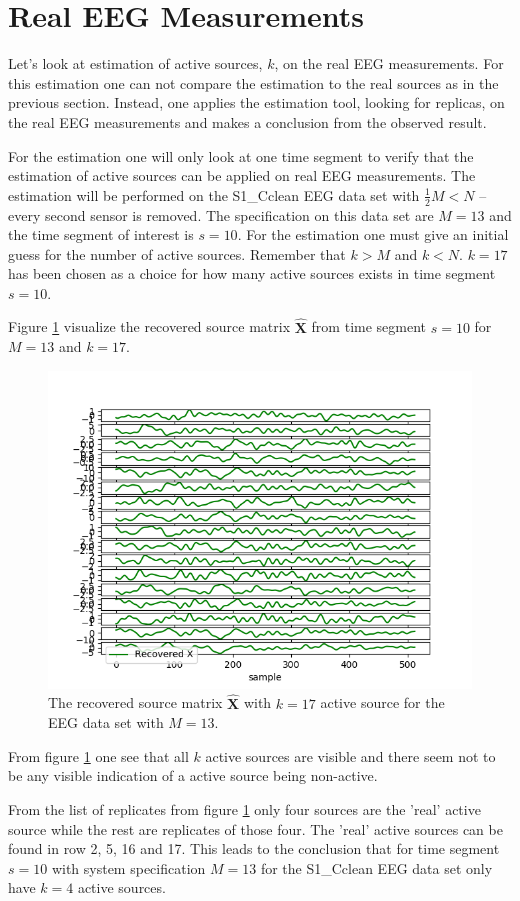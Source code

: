 \section{Real EEG Measurements}
Let's look at estimation of active sources, $k$, on the real EEG measurements. 
For this estimation one can not compare the estimation to the real sources as in the previous section.
Instead, one applies the estimation tool, looking for replicas, on the real EEG measurements and makes a conclusion from the observed result.

For the estimation one will only look at one time segment to verify that the estimation of active sources can be applied on real EEG measurements. The estimation will be performed on the S1\_Cclean EEG data set with $\frac{1}{2} M < N$ -- every second sensor is removed. The specification on this data set are $M=13$ and the time segment of interest is $s = 10$. 
For the estimation one must give an initial guess for the number of active sources. Remember that $k>M$ and $k<N$.  
$k = 17$ has been chosen as a choice for how many active sources exists in time segment $s = 10$. 

Figure \ref{fig:eeg_k} visualize the recovered source matrix $\hat{\mathbf{X}}$ from time segment $s=10$ for $M=13$ and $k = 17$.
\begin{figure}[H]
    \centering
	\includegraphics[scale=0.5]{figures/ch_estimate/eeg_k_timeseg_10.png}
	\caption{The recovered source matrix $\hat{\mathbf{X}}$ with $k=17$ active source for the EEG data set with $M=13$.}
	\label{fig:eeg_k}
\end{figure}
\noindent
From figure \ref{fig:eeg_k} one see that all $k$ active sources are visible and there seem not to be any visible indication of a active source being non-active. 

From the list of replicates from figure \ref{fig:eeg_k} only four sources are the 'real' active source while the rest are replicates of those four. The 'real' active sources can be found in row 2, 5, 16 and 17. This leads to the conclusion that for time segment $s=10$ with system specification $M=13$ for the S1\_Cclean EEG data set only have $k=4$ active sources.



